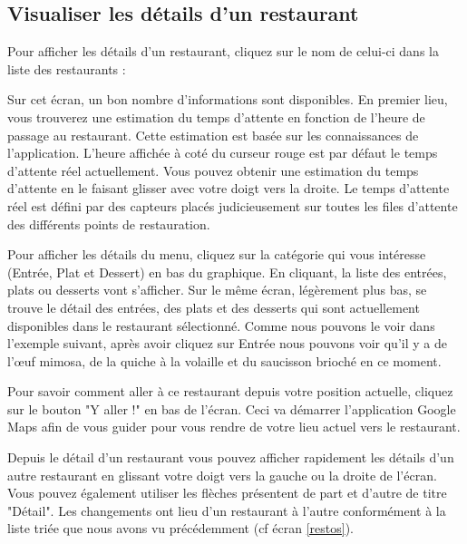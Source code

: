 \subsection{Visualiser les détails d'un restaurant}
Pour afficher les détails d'un restaurant, cliquez sur le nom de celui-ci dans
la liste des restaurants :  

Sur cet écran, un bon nombre d'informations sont disponibles. En premier lieu,
vous trouverez une estimation du temps d'attente en fonction de l'heure de
passage au restaurant. Cette estimation est basée sur les connaissances
de l'application. L'heure affichée à coté du curseur rouge est par défaut le
temps d'attente réel actuellement. Vous pouvez obtenir une estimation du temps
d'attente en le faisant glisser avec votre doigt vers la droite.
Le temps d'attente réel est défini par des capteurs placés judicieusement
sur toutes les files d'attente des différents points de restauration.

Pour afficher les détails du menu, cliquez sur la catégorie qui vous intéresse 
(Entrée, Plat et Dessert) en bas du graphique. En cliquant, la liste des entrées, 
plats ou desserts vont s'afficher. 
Sur le même écran, légèrement plus bas, se trouve le détail des entrées,
des plats et des desserts qui sont actuellement disponibles dans le restaurant
sélectionné. Comme nous pouvons le voir dans l'exemple suivant, après
avoir cliquez sur Entrée nous pouvons voir qu'il y a de l'\oe uf mimosa, 
de la quiche à la volaille et du saucisson brioché en ce moment.

Pour savoir comment aller à ce restaurant depuis votre position actuelle, cliquez
sur le bouton "Y aller !" en bas de l'écran. 
Ceci va démarrer l'application Google Maps afin de vous guider pour
vous rendre de votre lieu actuel vers le restaurant.

Depuis le détail d'un restaurant vous pouvez afficher rapidement les détails 
d'un autre restaurant en glissant votre doigt vers la
gauche ou la droite de l'écran. Vous pouvez également utiliser les flèches présentent
de part et d'autre de titre "Détail". 
Les changements ont lieu d'un restaurant à l'autre
conformément à la liste triée que nous avons vu précédemment (cf écran \ref{restos}).

